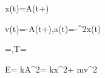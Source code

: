 x(t)=A\cos(\omega t+\varphi)

v(t)=-A\omega\sin(\omega t+\varphi),\qquad a(t)=-\omega^2x(t)

\omega=,\qquad T=\frac{2\pi}{\omega}

E= kA^2= kx^2+ mv^2
